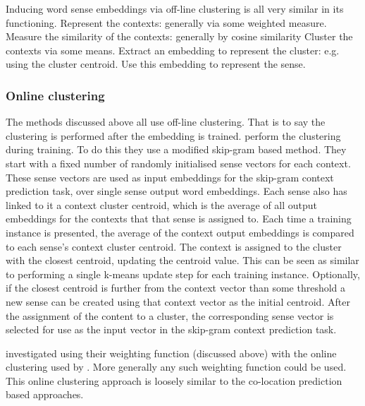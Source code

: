 \documentclass[12pt,parskip]{komatufte}
\begin{document}

Inducing word sense embeddings via off-line clustering is all very similar in its functioning.
Represent the contexts: generally via some weighted measure.
Measure the similarity of the contexts: generally by cosine similarity
Cluster the contexts via some means.
Extract an embedding to represent the cluster: e.g. using the cluster centroid.
Use this embedding to represent the sense.

\subsubsection{Online clustering}
The methods discussed above all use off-line clustering.
That is to say the clustering is performed after the embedding is trained.
 perform the clustering during training.
To do this they use a modified skip-gram based method.
They start with a fixed number of randomly initialised sense vectors for each context.
These sense vectors are used as input embeddings for the skip-gram context prediction task, over single sense output word embeddings.
Each sense also has linked to it a context cluster centroid, which is the average of all output embeddings for the contexts that that sense is assigned to.
Each time a training instance is presented, the average of the context output embeddings is compared to each sense's context cluster centroid.
The context is assigned to the cluster with the closest centroid, updating the centroid value.
This can be seen as similar to performing a single k-means update step for each training instance.
Optionally, if the closest centroid is further from the context vector than some threshold  a new sense can be created using that context vector as the initial centroid.
After the assignment of the content to a cluster, the corresponding sense vector is selected for use as the input vector in the skip-gram context prediction task.

\textcite{kaageback2015neural} investigated using their weighting function (discussed above) with the online clustering used by \textcite{neelakantan2015efficient}.
More generally any such weighting function could be used.
This online clustering approach is loosely similar to the co-location prediction based approaches.
\end{document}

